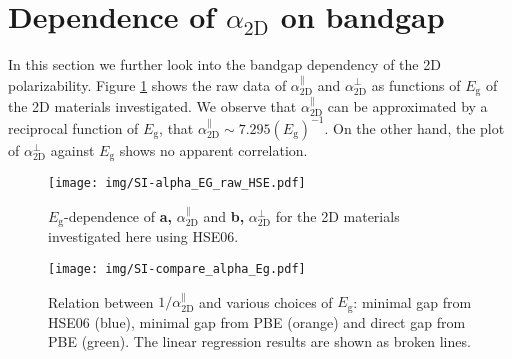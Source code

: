\documentclass[manuscript=suppinfo,email=true,hyperref=true,keywords=false]{achemso}
\begin{document}
\section{Dependence of $\alpha_{\mathrm{2D}}$ on bandgap}
\label{sec:pol-2D-Eg}

In this section we further look into the bandgap dependency of the 2D
polarizability. Figure \ref{fig:SI-raw-HSE} shows the raw data of
$\alpha_{\mathrm{2D}}^{\parallel}$ and $\alpha_{\mathrm{2D}}^{\perp}$
as functions of $E_{\mathrm{g}}$ of the 2D materials investigated. We
observe that $\alpha_{\mathrm{2D}}^{\parallel}$ can be approximated by
a reciprocal function of $E_{\mathrm{g}}$, that
$\alpha_{\mathrm{2D}}^{\parallel}\sim{}
7.295(E_{\mathrm{g}})^{-1}$. On the other hand, the plot of
$\alpha_{\mathrm{2D}}^{\perp}$ against $E_{\mathrm{g}}$ shows no
apparent correlation.
\begin{figure}[htbp]
  \centering
  \texttt{[image: img/SI-alpha\_EG\_raw\_HSE.pdf]}
  \caption{$E_{\mathrm{g}}$-dependence of \textbf{a,} $\alpha_{\mathrm{2D}}^{\parallel}$ and
    \textbf{b,} $\alpha_{\mathrm{2D}}^{\perp}$ for the 2D materials investigated here using HSE06.}
  \label{fig:SI-raw-HSE}
\end{figure}

\begin{figure}[htbp]
  \centering
  \texttt{[image: img/SI-compare\_alpha\_Eg.pdf]}
  \caption{Relation between $1/\alpha_{\mathrm{2D}}^{\parallel}$ and various choices
    of $E_{\mathrm{g}}$: minimal gap from HSE06 (blue), minimal gap
    from PBE (orange) and direct gap from PBE (green). The linear
    regression results are shown as broken lines.}
  \label{fig:alpha-Eg-diff}
\end{figure}
\end{document}
